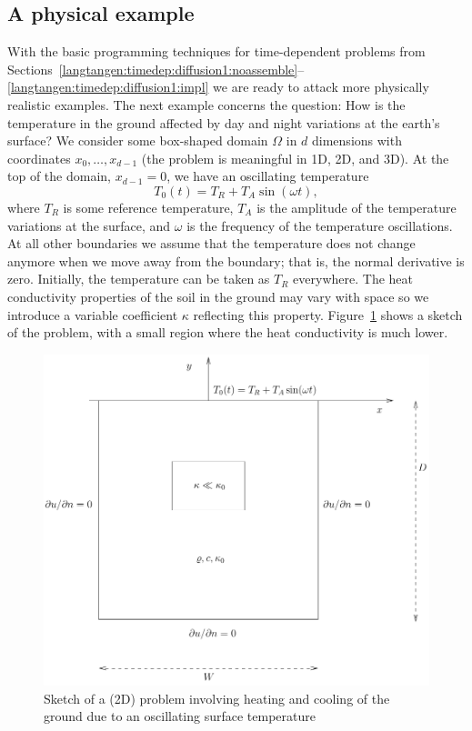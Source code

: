\subsection{A physical example}
\label{langtangen:timedep:diffusion2:sin}

With the basic programming techniques for time-dependent problems from
Sections~\ref{langtangen:timedep:diffusion1:noassemble}--\ref{langtangen:timedep:diffusion1:impl}
we are ready to attack more physically realistic examples.  The next
example concerns the question: How is the temperature in the ground
affected by day and night variations at the earth's surface?  We consider
some box-shaped domain $\Omega$ in $d$ dimensions with coordinates
$x_0,\ldots,x_{d-1}$ (the problem is meaningful in 1D, 2D, and 3D).
At the top of the domain, $x_{d-1}=0$, we have an oscillating temperature
\begin{equation}
  T_0(t) = T_R + T_A\sin (\omega t),
\end{equation}
where $T_R$ is some reference temperature, $T_A$ is the amplitude
of the temperature variations at the surface, and $\omega$ is the
frequency of the temperature oscillations.  At all other boundaries
we assume that the temperature does not change anymore when we
move away from the boundary; that is, the normal derivative is zero.
Initially, the temperature can be taken as $T_R$ everywhere.  The heat
conductivity properties of the soil in the ground may vary with space so
we introduce a variable coefficient $\kappa$ reflecting this property.
Figure~\ref{langtangen:timedep:diffusion2:sin:fig1} shows a sketch of the
problem, with a small region where the heat conductivity is much lower.
\begin{figure}
\centerline{
\includegraphics[width=0.8\linewidth]{chapters/langtangen/pdf/daynight.pdf}}
  \caption{Sketch of a (2D) problem involving heating and cooling of
  the ground due to an oscillating surface temperature}
\label{langtangen:timedep:diffusion2:sin:fig1}
\end{figure}


